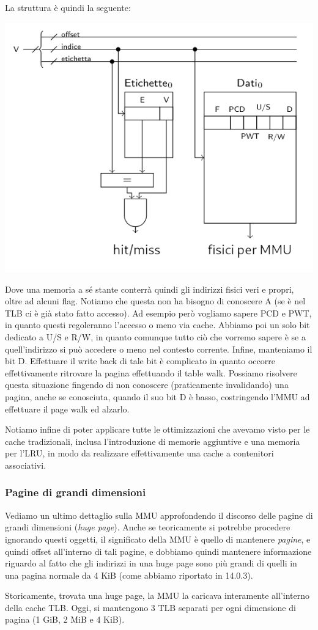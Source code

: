 \documentclass[a4paper,11pt]{article}
\begin{document}
\noindent
\begin{minipage}{\textwidth}
La struttura è quindi la seguente:
\begin{center}
	\includegraphics[scale=0.78]{../figures/tlb.png}
\end{center}
\end{minipage}

Dove una memoria a sé stante conterrà quindi gli indirizzi fisici veri e propri, oltre ad alcuni flag.
Notiamo che questa non ha bisogno di conoscere A (se è nel TLB ci è già stato fatto accesso).
Ad esempio però vogliamo sapere PCD e PWT, in quanto questi regoleranno l'accesso o meno via cache.
Abbiamo poi un solo bit dedicato a U/S e R/W, in quanto comunque tutto ciò che vorremo sapere è se a quell'indirizzo si può accedere o meno nel contesto corrente.
Infine, manteniamo il bit D.
Effettuare il write back di tale bit è complicato in quanto occorre effettivamente ritrovare la pagina effettuando il table walk.
Possiamo risolvere questa situazione fingendo di non conoscere (praticamente invalidando) una pagina, anche se conosciuta, quando il suo bit D è basso, costringendo l'MMU ad effettuare il page walk ed alzarlo. 

Notiamo infine di poter applicare tutte le ottimizzazioni che avevamo visto per le cache tradizionali, inclusa l'introduzione di memorie aggiuntive e una memoria per l'LRU, in modo da realizzare effettivamente una cache a contenitori associativi.

\subsubsection{Pagine di grandi dimensioni}
Vediamo un ultimo dettaglio sulla MMU approfondendo il discorso delle pagine di grandi dimensioni (\textit{huge page}).
Anche se teoricamente si potrebbe procedere ignorando questi oggetti, il significato della MMU è quello di mantenere \textit{pagine}, e quindi offset all'interno di tali pagine, e dobbiamo quindi mantenere informazione riguardo al fatto che gli indirizzi in una huge page sono più grandi di quelli in una pagina normale da 4 KiB (come abbiamo riportato in 14.0.3).

Storicamente, trovata una huge page, la MMU la caricava interamente all'interno della cache TLB.
Oggi, si mantengono 3 TLB separati per ogni dimensione di pagina (1 GiB, 2 MiB e 4 KiB).
\end{document}
